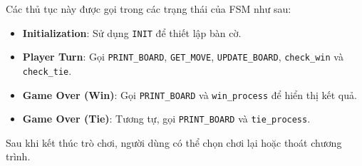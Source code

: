Các thủ tục này được gọi trong các trạng thái của FSM như sau:
\begin{itemize}
    \item \textbf{Initialization}: Sử dụng \texttt{INIT} để thiết lập bàn cờ.
    \item \textbf{Player Turn}: Gọi \texttt{PRINT\_BOARD}, \texttt{GET\_MOVE}, \texttt{UPDATE\_BOARD}, \texttt{check\_win} và \texttt{check\_tie}.
    \item \textbf{Game Over (Win)}: Gọi \texttt{PRINT\_BOARD} và \texttt{win\_process} để hiển thị kết quả.
    \item \textbf{Game Over (Tie)}: Tương tự, gọi \texttt{PRINT\_BOARD} và \texttt{tie\_process}.
\end{itemize}
Sau khi kết thúc trò chơi, người dùng có thể chọn chơi lại hoặc thoát chương trình.